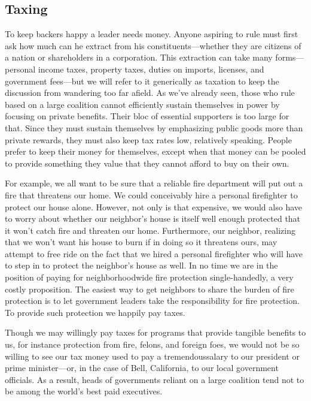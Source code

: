 \documentclass[10pt]{article}
\begin{document}
\subsection{Taxing}

{\large To keep backers happy a leader needs money. Anyone aspiring to rule must
first ask how much can he extract from his constituents---whether they are
citizens of a nation or shareholders in a corporation. This extraction can take
many forms---personal income taxes, property taxes, duties on imports, licenses,
and government fees---but we will refer to it generically as taxation to keep the
discussion from wandering too far afield. As we've already seen, those who rule
based on a large coalition cannot efficiently sustain themselves in power by
focusing on private benefits. Their bloc of essential supporters is too large for
that. Since they must sustain themselves by emphasizing public goods more than
private rewards, they must also keep tax rates low, relatively speaking. People
prefer to keep their money for themselves, except when that money can be pooled
to provide something they value that they cannot afford to buy on their own.}

{\large For example, we all want to be sure that a reliable fire department will
put out a fire that threatens our home. We could conceivably hire a personal
firefighter to protect our house alone. However, not only is that expensive, we
would also have to worry about whether our neighbor's house is itself well enough
protected that it won't catch fire and threaten our home. Furthermore, our
neighbor, realizing that we won't want his house to burn if in doing so it
threatens ours, may attempt to free ride on the fact that we hired a personal
firefighter who will have to step in to protect the neighbor's house as well. In
no time we are in the position of paying for neighborhoodwide fire protection
single-handedly, a very costly proposition. The easiest way to get neighbors to
share the burden of fire protection is to let government leaders take the
responsibility for fire protection. To provide such protection we happily pay
taxes.}

{\large Though we may willingly pay taxes for programs that provide tangible
benefits to us, for instance protection from fire, felons, and foreign foes, we
would not be so willing to see our tax money used to pay a tremendoussalary to
our president or prime minister---or, in the case of Bell, California, to our
local government officials. As a result, heads of governments reliant on a large
coalition tend not to be among the world's best paid executives.}
\end{document}
